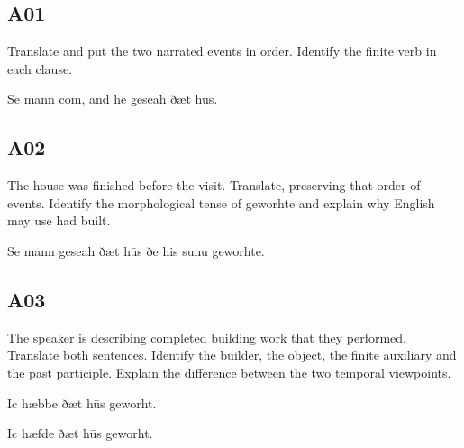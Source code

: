 \subsection*{A01}

\par\begin{minipage}{\linewidth}\raggedright
Translate and put the two narrated events in order. Identify the finite verb in each clause.

Se mann cōm, and hē geseah ðæt hūs.

\end{minipage}\par\addvspace{4pt}

\subsection*{A02}

\par\begin{minipage}{\linewidth}\raggedright
The house was finished before the visit. Translate, preserving that order of events. Identify the morphological tense of geworhte and explain why English may use had built.

Se mann geseah ðæt hūs ðe his sunu geworhte.

\end{minipage}\par\addvspace{4pt}

\subsection*{A03}

\par\begin{minipage}{\linewidth}\raggedright
The speaker is describing completed building work that they performed. Translate both sentences. Identify the builder, the object, the finite auxiliary and the past participle. Explain the difference between the two temporal viewpoints.

Ic hæbbe ðæt hūs geworht.

Ic hæfde ðæt hūs geworht.

\end{minipage}\par\addvspace{4pt}

